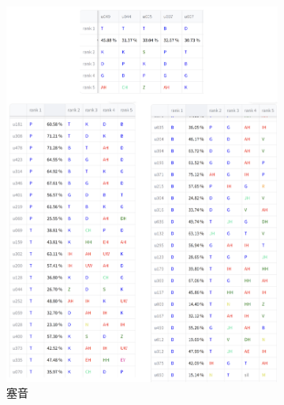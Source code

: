 {    {
        \newcommand{\tempwidth}[0]{0.8\linewidth}
        \begin{figure}
             \centering
             \begin{subfigure}{\textwidth}
                 \centering
                 \includegraphics[width=\tempwidth]{chapters/plo_phn.png}
                 \caption{塞音}
                 \label{fig:hub-u050-ap0500-ploobs}
             \end{subfigure}
             \vfill
             \begin{subfigure}{\textwidth}
                 \centering

\end{subfigure}
\end{figure}}}
